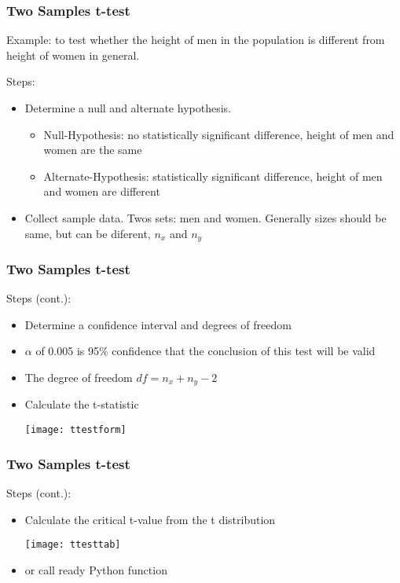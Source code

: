 \begin{frame}[fragile]\frametitle{Two Samples t-test}
Example: to test whether the height of men in the population is different from height of women in general.

Steps:
\begin{itemize}
\item  Determine a null and alternate hypothesis.
\begin{itemize}
\item  Null-Hypothesis: no statistically significant difference, height of men and women are the same
\item  Alternate-Hypothesis: statistically significant difference, height of men and women are different
\end{itemize}
\item Collect sample data. Twos sets: men and women. Generally sizes should be same, but can be diferent, $n_x$ and $n_y$
\end{itemize}
\end{frame} 
\begin{frame}[fragile]\frametitle{Two Samples t-test}
Steps (cont.):
\begin{itemize}
\item  Determine a confidence interval and degrees of freedom
\item $\alpha$ of 0.005 is 95\% confidence that the conclusion of this test will be valid
\item The degree of freedom $df = n_x + n_y - 2$
\item Calculate the t-statistic

\begin{center}
\texttt{[image: ttestform]}
\end{center}
\end{itemize}
\end{frame} 


\begin{frame}[fragile]\frametitle{Two Samples t-test}
Steps (cont.):
\begin{itemize}
\item  Calculate the critical t-value from the t distribution
\begin{center}
\texttt{[image: ttesttab]}
\end{center}
\item or call ready Python function
\end{itemize}
\end{frame} 


